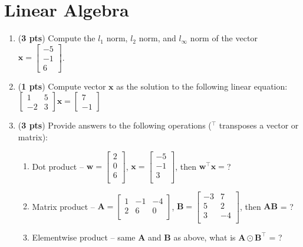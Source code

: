 \documentclass[11pt, letterpaper]{article}
\begin{document}
\section{Linear Algebra}
\begin{enumerate}[label=(\alph*)]

	\item (\textbf{3 pts}) Compute the $l_1$ norm, $l_2$ norm, and $l_\infty$ norm of the vector $\mathbf{x}=\begin{bmatrix} -5 \\ -1 \\ 6 \end{bmatrix}$.
	
	\item (\textbf{1 pts}) Compute vector $\mathbf{x}$ as the solution to the following linear equation:
	       $
	       \begin{bmatrix} 
                1 & 5 \\
                -2 & 3 
           \end{bmatrix}
           \mathbf{x} =
           \begin{bmatrix} 
                7  \\
                -1
           \end{bmatrix}
           $
           
	\item (\textbf{3 pts}) Provide answers to the following operations ($^\top$ transposes a vector or matrix):
	\begin{enumerate}[label=(\roman*)]
	
        \item Dot product -- $\mathbf{w} = \begin{bmatrix}
2\\
0\\
6\\
\end{bmatrix}$, $\mathbf{x}= \begin{bmatrix}
-5\\
-1\\
3\\
\end{bmatrix}$, then $\mathbf{w}^\top\mathbf{x} = $?
        \item Matrix product --
	       $\mathbf{A} = \begin{bmatrix} 
                1 &  -1 & -4\\
                2 & 6 & 0\\
           \end{bmatrix}$, 
           $\mathbf{B} = \begin{bmatrix} 
                -3 & 7\\
                5 & 2\\
                3 & -4\\
            \end{bmatrix}$, then $\mathbf{A}\mathbf{B}$ = ?
           

        \item Elementwise product -- same $\mathbf{A}$ and $\mathbf{B}$ as above, what is $\mathbf{A}\odot\mathbf{B^\top}$ = ?
    \end{enumerate}
\end{enumerate}
\end{document}
